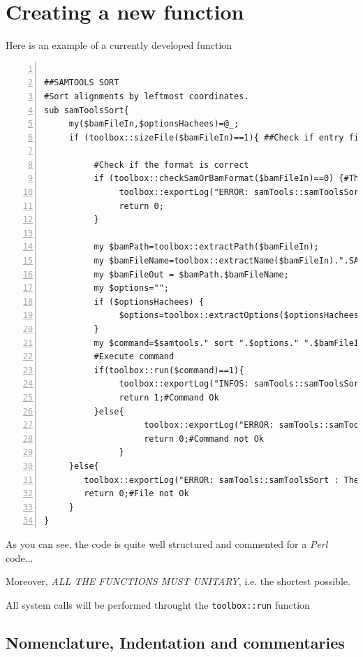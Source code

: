 \documentclass[a4paper,10pt]{report}
\begin{document}
\chapter{Creating a new function}

Here is an example of a currently developed function
\sloppy
\begin{lstlisting}[numbers=left]

##SAMTOOLS SORT
#Sort alignments by leftmost coordinates.
sub samToolsSort{
     my($bamFileIn,$optionsHachees)=@_;
     if (toolbox::sizeFile($bamFileIn)==1){ ##Check if entry file exist and is not empty
          
          #Check if the format is correct
          if (toolbox::checkSamOrBamFormat($bamFileIn)==0) {#The file is not a BAM/SAM file
               toolbox::exportLog("ERROR: samTools::samToolsSort : The file $bamFileIn is not a SAM/BAM file\n",0);
               return 0;
          }
          
          my $bamPath=toolbox::extractPath($bamFileIn);
          my $bamFileName=toolbox::extractName($bamFileIn).".SAMTOOLSSORT";
          my $bamFileOut = $bamPath.$bamFileName;
          my $options="";
          if ($optionsHachees) {
               $options=toolbox::extractOptions($optionsHachees);
          }
          my $command=$samtools." sort ".$options." ".$bamFileIn." ".$bamFileOut;
          #Execute command
          if(toolbox::run($command)==1){
               toolbox::exportLog("INFOS: samTools::samToolsSort : Correctly done\n",1);
               return 1;#Command Ok
          }else{
                    toolbox::exportLog("ERROR: samTools::samToolsSort : Uncorrectly done\n",0);
                    return 0;#Command not Ok
               }
     }else{
        toolbox::exportLog("ERROR: samTools::samToolsSort : The file $bamFileIn is uncorrect\n",0);
        return 0;#File not Ok
     }
}

\end{lstlisting}

As you can see, the code is quite well structured and commented for a \textit{Perl} code...

Moreover, \emph{ALL THE FUNCTIONS MUST UNITARY}, i.e. the shortest possible.

All system calls will be performed throught the \texttt{toolbox::run} function

\section{Nomenclature, Indentation and commentaries}
\end{document}
